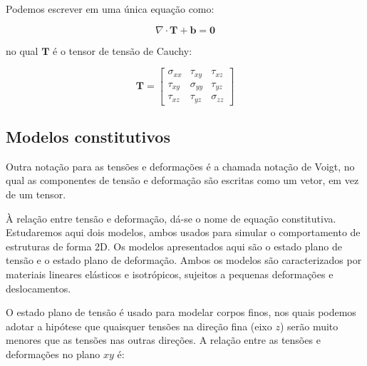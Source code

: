         Podemos escrever em uma única equação como:

        \begin{equation}
            \nabla \cdot \mathbf{T} + \mathbf{b} = \mathbf{0}
            \label{eq:equilibrio}
        \end{equation}

        \noindent no qual $\mathbf{T}$ é o tensor de tensão de Cauchy:

        \begin{equation*}
            \mathbf{T} = 
            \begin{bmatrix}
                \sigma_{xx} & \tau_{xy}   & \tau_{xz}\\
                \tau_{xy}   & \sigma_{yy} & \tau_{yz}\\
                \tau_{xz}   & \tau_{yz}   & \sigma_{zz}
            \end{bmatrix}
        \end{equation*}

    \subsection{Modelos constitutivos}

        Outra notação para as tensões e deformações é a chamada notação de Voigt, no qual as componentes de tensão e deformação são escritas como um vetor, em vez de um tensor.

        À relação entre tensão e deformação, dá-se o nome de equação constitutiva. Estudaremos aqui dois modelos, ambos usados para simular o comportamento de estruturas de forma 2D. Os modelos apresentados aqui são o estado plano de tensão e o estado plano de deformação. Ambos os modelos são caracterizados por materiais lineares elásticos e isotrópicos, sujeitos a pequenas deformações e deslocamentos.

        O estado plano de tensão é usado para modelar corpos finos, nos quais podemos adotar a hipótese que quaisquer tensões na direção fina (eixo $z$) serão muito menores que as tensões nas outras direções. A relação entre as tensões e deformações no plano $xy$ é:

